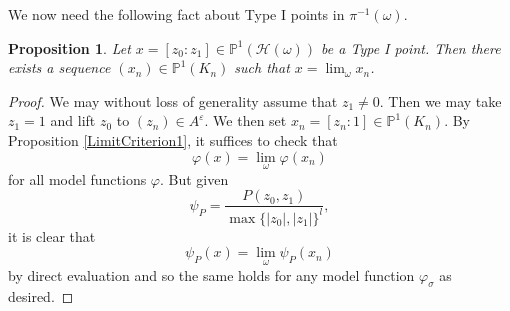 \documentclass[10pt]{amsart}
\newcommand{\bb}{\mathbb}
\newcommand{\vphi}{\varphi}
\newcommand{\cal}{\mathcal}
\newcommand{\eps}{\varepsilon}
\numberwithin{theorem}{section}
\newtheorem{proposition}[theorem]{Proposition}
\numberwithin{example}{section}
\numberwithin{definition}{section}
\begin{document}
We now need the following fact about Type I points in $\pi^{-1}(\omega)$. 

\begin{proposition} \label{TypeOne1}
Let $x = [z_0:z_1] \in \bb{P}^1(\cal{H}(\omega))$ be a Type I point. Then there exists a sequence $(x_n) \in \bb{P}^1(K_n)$ such that $x = \lim_{\omega} x_n$. 
\end{proposition}

\begin{proof}
We may without loss of generality assume that $z_1 \not = 0$. Then we may take $z_1 = 1$ and lift $z_0$ to $(z_n) \in A^{\eps}$. We then set $x_n = [z_n:1] \in \bb{P}^1(K_n)$. By Proposition \ref{LimitCriterion1}, it suffices to check that 
$$\vphi(x) = \lim_{\omega} \vphi(x_n)$$
for all model functions $\vphi$. But given 
$$\psi_P = \frac{P(z_0,z_1)}{\max\{|z_0|,|z_1|\}^l},$$
it is clear that 
$$\psi_P(x) = \lim_{\omega}  \psi_P(x_n)$$
by direct evaluation and so the same holds for any model function $\vphi_{\sigma}$ as desired. 

\end{proof}
\end{document}
